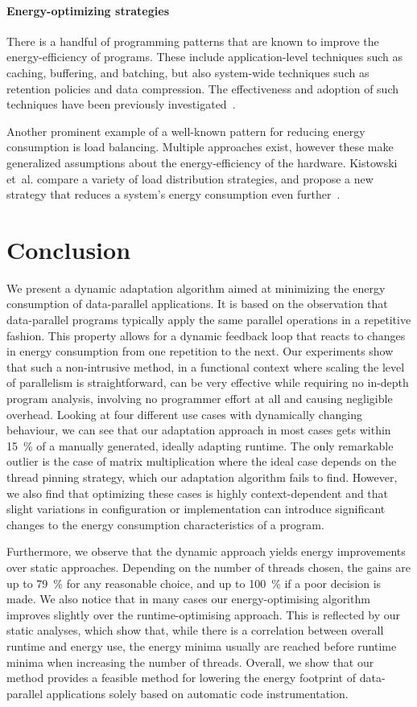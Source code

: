 \documentclass[runningheads]{llncs}
\begin{document}
\paragraph{Energy-optimizing strategies}
There is a handful of programming patterns that are known to improve the energy-efficiency of programs.
These include applica\-tion-level techniques such as caching, buffering, and batching, but also system-wide techniques such as retention policies and data compression.
The effectiveness and adoption of such techniques have been previously investigated~\cite{jin2017survey,funke2024experimental}.

Another prominent example of a well-known pattern for reducing energy consumption is load balancing.
Multiple approaches exist, however these make generalized assumptions about the energy-efficiency of the hardware.
Kistowski et~al. compare a variety of load distribution strategies, and propose a new strategy that reduces a system's energy consumption even further~\cite{kistowski2015energy}.

\section{Conclusion}
We present a dynamic adaptation algorithm aimed at minimizing the energy consumption of data-parallel applications.
It is based on the observation that data-parallel programs typically apply the same parallel operations in a repetitive fashion.
This property allows for a dynamic feedback loop that reacts to changes in energy consumption from one repetition to the next.
Our experiments show that such a non-intrusive method, in a functional context where scaling the level of parallelism is straightforward, can be very effective while requiring no in-depth program analysis, involving no programmer effort at all and causing negligible overhead.
Looking at four different use cases with dynamically changing behaviour, we can see that our adaptation approach in most cases gets within \qty{15}{\percent} of a manually generated, ideally adapting runtime.
The only remarkable outlier is the case of matrix multiplication where the ideal case depends on the thread pinning strategy, which our adaptation algorithm fails to find.
However, we also find that optimizing these cases is highly context-dependent and that slight variations in configuration or implementation can introduce significant changes to the energy consumption characteristics of a program.

Furthermore, we observe that the dynamic approach yields energy improvements over static approaches.
Depending on the number of threads chosen, the gains are up to \qty{79}{\percent} for any reasonable choice, and up to \qty{100}{\percent} if a poor decision is made.
We also notice that in many cases our energy-optimising algorithm improves slightly over the runtime-optimising approach.
This is reflected by our static analyses, which show that, while there is a correlation between overall runtime and energy use, the energy minima usually are reached before runtime minima when increasing the number of threads.
Overall, we show that our method provides a feasible method for lowering the energy footprint of data-parallel applications solely based on automatic code instrumentation.
\end{document}
